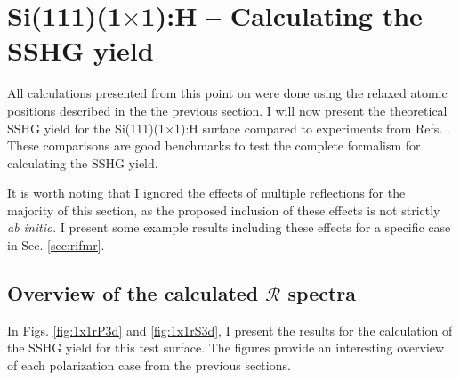 
\section{\texorpdfstring{Si(111)(1$\times$1):H}{Si(111)(1x1):H} -- Calculating 
the SSHG yield}

All calculations presented from this point on were done using the relaxed atomic
positions described in the the previous section. I will now present the
theoretical SSHG yield for the Si(111)(1$\times$1):H surface compared to
experiments from Refs. \cite{mitchellSS01, mejiaPRB02, bergfeldPRL04}. These
comparisons are good benchmarks to test the complete formalism for calculating
the SSHG yield.

It is worth noting that I ignored the effects of multiple reflections for the
majority of this section, as the proposed inclusion of these effects is not
strictly \emph{ab initio}. I present some example results including these
effects for a specific case in Sec. \ref{sec:rifmr}.



\subsection{Overview of the calculated \texorpdfstring{$\mathcal{R}$}{R}
spectra}\label{sec:1x1R3D}

In Figs. \ref{fig:1x1rP3d} and \ref{fig:1x1rS3d}, I present the results for the
calculation of the SSHG yield for this test surface. The figures provide an
interesting overview of each polarization case from the previous sections.

